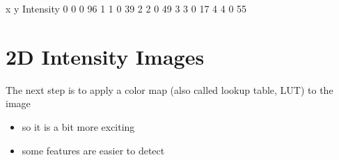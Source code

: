 \documentclass[letterpaper,10pt,english]{sphinxmanual}
\begin{document}
\begin{sphinxVerbatim}[commandchars=\\\{\}]
   x  y  Intensity
0  0  0         96
1  1  0         39
2  2  0         49
3  3  0         17
4  4  0         55
\end{sphinxVerbatim}

\begin{sphinxVerbatim}[commandchars=\\\{\}]
   
   
\end{sphinxVerbatim}

\noindent{}


\section{2D Intensity Images}
\label{\detokenize{01-Introduction:d-intensity-images}}
\sphinxAtStartPar
The next step is to apply a color map (also called lookup table, LUT) to the image
\begin{itemize}
\item {} 
\sphinxAtStartPar
so it is a bit more exciting

\item {} 
\sphinxAtStartPar
some features are easier to detect 

\end{itemize}
\end{document}
